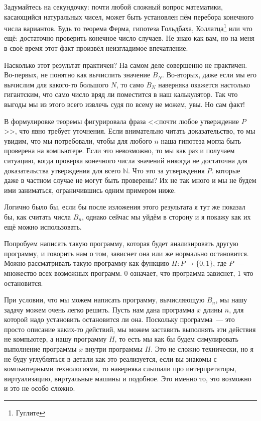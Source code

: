 Задумайтесь на секундочку: почти любой сложный вопрос математики, касающийся натуральных чисел, может быть установлен пём перебора конечного числа вариантов. Будь то теорема Ферма, гипотеза Гольдбаха, Коллатца\footnote{Гуглите} или что ещё: достаточно проверить конечное число случаев. Не знаю как вам, но на меня в своё время этот факт произвёл неизгладимое впечатление.

Насколько этот результат практичен? На самом деле совершенно не практичен. Во-первых, не понятно как вычислить значение $B_N$. Во-вторых, даже если мы его вычислим для какого-то большого $N$, то само $B_N$ наверняка окажется настолько гигантским, что само число вряд ли поместится в наш калькулятор. Так что выгоды мы из этого всего извлечь судя по всему не можем, увы. Но сам факт!

В формулировке теоремы фигурировала фраза <<почти любое утверждение $P$>>, что явно требует уточнения. Если внимательно читать доказательство, то мы увидим, что мы потребовали, чтобы для любого $n$ наша гипотеза могла быть проверена на компьютере. Если это невозможно, то мы как раз и получаем ситуацию, когда проверка конечного числа значений никогда не достаточна для доказательства утверждения для всего $\mathbb{N}$. Что это за утверждения $P$. которые даже в частном случае не могут быть проверены? Их не так много и мы не будем ими заниматься, ограничившись одним примером ниже.

Логично было бы, если бы после изложения этого результата я тут же показал бы, как считать числа $B_n$, однако сейчас мы уйдём в сторону и я покажу как их ещё можно использовать.

Попробуем написать такую программу, которая будет анализировать другую программу, и говорить нам о том, зависнет она или же нормально остановится. Можно рассматривать такую программу как функцию $H:P\to\{0,1\}$, где $P$~--- множество всех возможных программ. 0 означает, что программа зависнет, 1 что остановится.

При условии, что мы можем написать программу, вычисляющую $B_n$, мы нашу задачу можем очень легко решить. Пусть нам дана программа $x$ длины $n$, для которой надо установить остановится ли она. Поскольку программа~--- это просто описание каких-то действий, мы можем заставить выполнять эти действия не компьютер, а нашу программу $H$, то есть мы как бы будем симулировать выполнение программы $x$ внутри программы $H$. Это не сложно технически, но я не буду углубляться в детали как это реализуется, если вы знакомы с компьютерными технологиями, то наверняка слышали про интерпретаторы, виртуализацию, виртуальные машины и подобное. Это именно то, это возможно и это не особо сложно.

